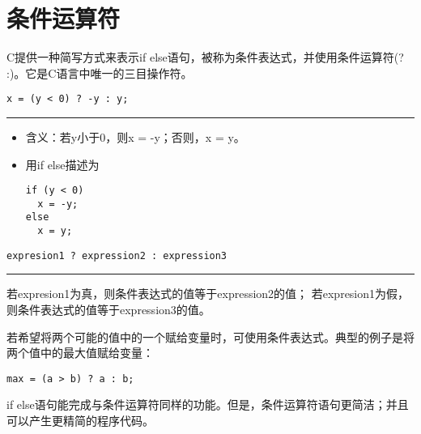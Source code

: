 \section{条件运算符}
\begin{frame}[fragile]\ft{\secname}
C提供一种简写方式来表示{\tf if else}语句，被称为条件表达式，并使用条件运算符{(\tf ? :)}。它是C语言中唯一的三目操作符。
\end{frame}

\begin{frame}[fragile]\ft{\secname}
\begin{lstlisting}[title=求绝对值]
x = (y < 0) ? -y : y;
\end{lstlisting}
\rule{\textwidth}{.8mm} \pause \vspace{.05in}

\begin{itemize}
\item
含义：若y小于0，则x = -y；否则，x = y。\\[0.1in]
\item 用if else描述为
\begin{lstlisting}
if (y < 0)
  x = -y;
else
  x = y;  
\end{lstlisting}
\end{itemize}
\end{frame}

\begin{frame}[fragile]\ft{\secname}
\begin{lstlisting}[title=条件表达式的语法]
expresion1 ? expression2 : expression3
\end{lstlisting}
\rule{\textwidth}{.8mm} \pause \vspace{.05in}

若expresion1为真，则条件表达式的值等于expression2的值；
若expresion1为假，则条件表达式的值等于expression3的值。
\end{frame}

\begin{frame}[fragile]\ft{\secname}
若希望将两个可能的值中的一个赋给变量时，可使用条件表达式。典型的例子是将两个值中的最大值赋给变量：
\begin{lstlisting}[frame=single]
max = (a > b) ? a : b;
\end{lstlisting}
\end{frame}

\begin{frame}[fragile]\ft{\secname}
if else语句能完成与条件运算符同样的功能。但是，条件运算符语句更简洁；并且可以产生更精简的程序代码。
\end{frame}

